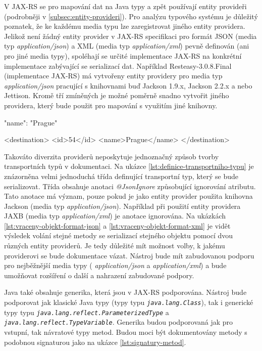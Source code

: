 \documentclass[11pt,twoside,a4paper]{book}
\begin{document}
V JAX-RS se pro mapování dat na Java typy a zpět používají entity provideři (podrobněji v
\ref{subsec:entity-provideri}). Pro analýzu typového systému je důležitý poznatek, že ke každému media
typu lze zaregistrovat jiného entity providera. Jelikož není žádný entity provider v JAX-RS
specifikaci pro formát JSON (media typ {\em application/json}) a XML (media typ
{\em application/xml}) pevně definován (ani pro jiné media typy), spoléhají se
určité implementace JAX-RS na konkrétní implementace zabývající se serializací dat. Například
Resteasy-3.0.8.Final \cite{RESTEasyHome} (implementace JAX-RS) má vytvořeny entity providery
pro media typ {\em application/json} pracující s knihovnami buď Jackson 1.9.x, Jackson 2.2.x a
nebo Jettison. Kromě tří zmíněných je možné poměrně snadno vytvořit jiného providera, který
bude použit pro mapování s využitím jiné knihovny. 

\begin{code}[frame=single,caption={Vrácený objekt při použití media typu application/json
},label={lst:vraceny-objekt-format-json}]
{
    "name": "Prague"
}
\end{code}

\begin{code}[frame=single,caption={Vrácený objekt při použití media typu
application/xml},label={lst:vraceny-objekt-format-xml}] 
<destination>
    <id>54</id> 
    <name>Prague</name>
</destination>
\end{code}

Takováto diverzita providerů neposkytuje jednoznačný způsob tvorby transportních
typů v dokumentaci. Na ukázce \ref{lst:definice-transportniho-typu} je
znázorněna velmi jednoduchá třída definující transportní typ, který se bude
serializovat. Třída obsahuje anotaci {\em @JsonIgnore} způsobující ignorování
atributu. Tato anotace má význam, pouze pokud je jako entity provider použita
knihovna Jackson (media typ {\em application/json}).
Například při použití entity providera JAXB (media typ {\em application/xml}) je
anotace ignorována. Na ukázkách \ref{lst:vraceny-objekt-format-json} a
\ref{lst:vraceny-objekt-format-xml} je vidět výsledek volání stejné metody se
serializací stejného objektu pomocí dvou různých entity providerů. Je tedy
důležité mít možnost volby, k jakému providerovi se bude dokumentace vázat.
Nástroj bude mít zabudovanou podporu pro nejběžnější media typy ({\em
application/json} a {\em application/xml}) a bude umožňovat rozšíření o další a
nahrazení zabudované podpory.

Java také obsahuje generika, která jsou v JAX-RS podporována. Nástroj bude
podporovat jak klasické Java typy (typy typu {\em \nolinkurl{java.lang.Class}}),
tak i generické typy typu {\em \nolinkurl{java.lang.reflect.ParameterizedType}}
a {\em \nolinkurl{java.lang.reflect.TypeVariable}}. Generika budou podporovaná
jak pro vstupní, tak návratové typy metod. Budou moci být dokumentovány metody s
podobnou signaturou jako na ukázce \ref{lst:signatury-metod}.
\end{document}
